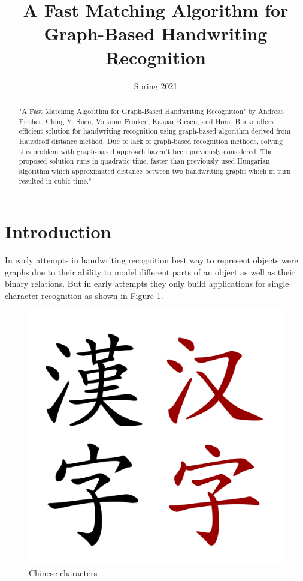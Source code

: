 \documentclass{article}
\title{\textbf{A Fast Matching Algorithm for Graph-Based Handwriting Recognition}}
\author{Emin Sadikhov \\  \href{emin.sadikhov@ozu.edu.tr} 
   \and Esad Simitcioglu \\  \href{esad.simitcioglu@ozu.edu.tr} }
\date{Spring 2021}
\begin{document}
\maketitle

\begin{abstract}
    "A Fast Matching Algorithm for Graph-Based Handwriting Recognition" by Andreas Fischer, Ching Y. Suen, Volkmar Frinken, Kaspar Riesen, and Horst Bunke offers efficient solution for handwriting recognition using graph-based algorithm derived from Hausdroff distance method. Due to lack of graph-based recognition methods, solving this problem with graph-based approach haven't been previously considered. The proposed solution runs in quadratic time, faster than previously used Hungarian algorithm which approximated distance between two handwriting graphs which in turn resulted in cubic time."
\end{abstract}

\section{Introduction}
 In early attempts in handwriting recognition best way to represent objects were graphs due to their ability to model different parts of an object as well as their binary relations. But in early attempts they only build applications for single character recognition as shown in Figure 1.
 
\begin{figure}[h]
    \centering
    \includegraphics[width = .3\textwidth]{Images/Chinese.png}
    \caption{Chinese characters}
\end{figure}
 
\end{document}
